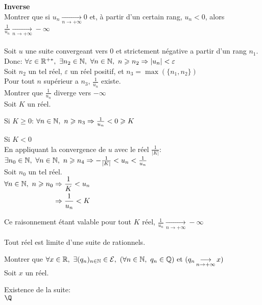 \documentclass[12pt,twoside,a4paper]{article}
\begin{document}
		\begin{preuve}
			\textbf{Inverse}\\
			Montrer que si $u_n\mathop{\longrightarrow}\limits_{n\rightarrow+\infty}0$ et, \`a partir d'un certain rang, $u_n<0$, alors $\frac{1}{u_n}\mathop{\longrightarrow}\limits_{n\rightarrow+\infty}-\infty$\\
			\\
			Soit $u$ une suite convergeant vers $0$ et strictement négative a partir d'un rang $n_1$.\\
			Donc: $\forall\varepsilon\in\mathbb{R}^{+*},\ \exists n_2\in\mathbb{N},\ \forall n\in\mathbb{N},\ n\geqslant n_2\Rightarrow|u_n|<\varepsilon$\\
			Soit $n_2$ un tel réel, $\varepsilon$ un réel positif, et $n_3=\max(\{n_1,n_2\})$\\
			Pour tout $n$ supérieur a $n_3$, $\frac{1}{u_n}$ existe.\\
			Montrer que $\frac{1}{u_n}$ diverge vers $-\infty$\\
			Soit $K$ un réel.
			\begin{liste}
				\item Si $K\geqslant0$: $\forall n\in\mathbb{N},\ n\geqslant n_3\Rightarrow \frac1{u_n}<0\geqslant K$
				\item Si $K<0$\\
					En appliquant la convergence de $u$ avec le réel $\frac1{|K|}$:\\
					$\exists n_0\in\N,\ \forall n\in\N,\ n\geqslant n_4\Rightarrow -\frac1{|K|}<u_n<\frac1{u_n}$\\
					Soit $n_0$ un tel réel.\\
					$\begin{aligned}
						\forall n\in\mathbb{N},\ n\geqslant n_0&\Rightarrow \frac1{K}<u_n\\
							&\Rightarrow \frac{1}{u_n}<K
					\end{aligned}$
			\end{liste}
			Ce raisonnement étant valable pour tout $K$ réel, $\frac1{u_n}\mathop{\longrightarrow}\limits_{n\rightarrow+\infty}-\infty$
		\end{preuve}
		\begin{prop}
			Tout réel est limite d'une suite de rationnels.
		\end{prop}
		\begin{preuve}
			Montrer que $\forall x\in\R,\ \exists (q_n)_{n\in\N}\in\mathcal{E},\ (\forall n\in\N,\ q_n\in\mathbb{Q})\et(q_n\mathop{\longrightarrow}\limits_{n\rightarrow+\infty}x)$\\
			Soit $x$ un réel.
			\begin{liste}
				\item Existence de la suite:\\
					$\Q$
			\end{liste}
		\end{preuve}
\end{document}
